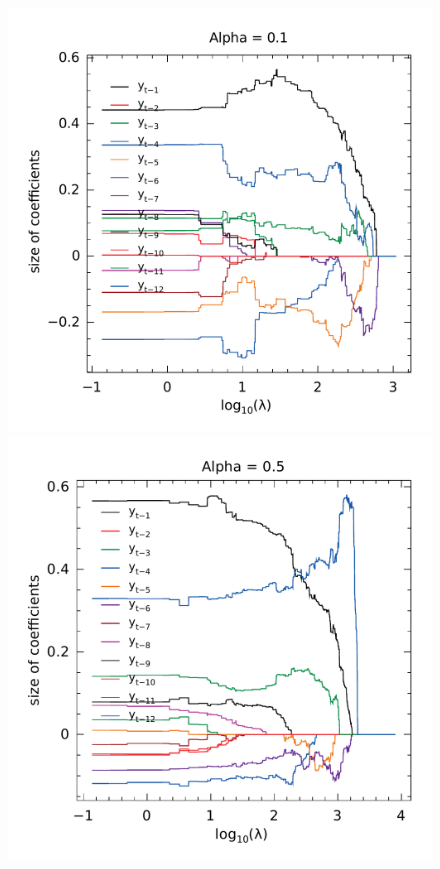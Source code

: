 \begin{figure}
\begin{minipage}[t]{0.4\linewidth}
\begin{minipage}[b]{\linewidth}
      \centering     \includegraphics[width=\textwidth]{Figuras/selecao-lasso/par-sellasso-01.pdf}
    \end{minipage}
     \begin{minipage}[b]{\linewidth}
      \centering     \includegraphics[width=\textwidth]{Figuras/selecao-lasso/par-sellasso-05.pdf}

\end{minipage}
\end{minipage}
\end{figure}
